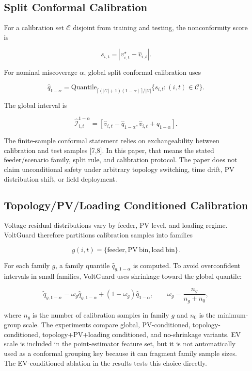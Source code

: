 \documentclass[
  preprint,12pt]{elsarticle}
\begin{document}
\subsection{Split Conformal
Calibration}\label{split-conformal-calibration}

For a calibration set \(\mathcal{C}\) disjoint from training and
testing, the nonconformity score is

\[
s_{i,t}=|v^\star_{i,t}-\hat v_{i,t}|.
\]

For nominal miscoverage \(\alpha\), global split conformal calibration
uses

\[
\hat q_{1-\alpha}
= \mathrm{Quantile}_{\lceil (|\mathcal{C}|+1)(1-\alpha)\rceil/|\mathcal{C}|}
\{s_{i,t}:(i,t)\in\mathcal{C}\}.
\]

The global interval is

\[
\widehat{\mathcal{I}}^{1-\alpha}_{i,t}
= [\hat v_{i,t}-\hat q_{1-\alpha},
   \hat v_{i,t}+\hat q_{1-\alpha}].
\]

The finite-sample conformal statement relies on exchangeability between
calibration and test samples {[}7,8{]}. In this paper, that means the
stated feeder/scenario family, split rule, and calibration protocol. The
paper does not claim unconditional safety under arbitrary topology
switching, time drift, PV distribution shift, or field deployment.

\subsection{Topology/PV/Loading Conditioned
Calibration}\label{topologypvloading-conditioned-calibration}

Voltage residual distributions vary by feeder, PV level, and loading
regime. VoltGuard therefore partitions calibration samples into families

\[
g(i,t)=\{\mathrm{feeder},\mathrm{PV\ bin},\mathrm{load\ bin}\}.
\]

For each family \(g\), a family quantile \(\hat q_{g,1-\alpha}\) is
computed. To avoid overconfident intervals in small families, VoltGuard
uses shrinkage toward the global quantile:

\[
\tilde q_{g,1-\alpha}
= \omega_g\hat q_{g,1-\alpha}
+(1-\omega_g)\hat q_{1-\alpha},
\qquad
\omega_g=\frac{n_g}{n_g+n_0},
\]

where \(n_g\) is the number of calibration samples in family \(g\) and
\(n_0\) is the minimum-group scale. The experiments compare global,
PV-conditioned, topology-conditioned, topology+PV+loading conditioned,
and no-shrinkage variants. EV scale is included in the point-estimator
feature set, but it is not automatically used as a conformal grouping
key because it can fragment family sample sizes. The EV-conditioned
ablation in the results tests this choice directly.
\end{document}
